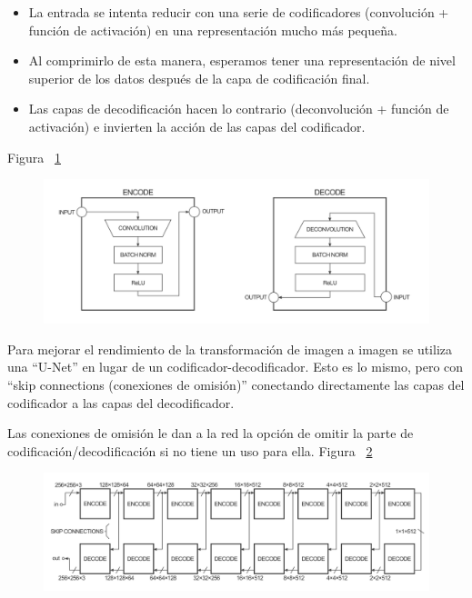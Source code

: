 \documentclass[10pt,journal,compsoc]{IEEEtran}\usepackage[T1]{fontenc}                              %
\begin{document}
\begin{itemize}
\item
  La entrada se intenta reducir con una serie de codificadores
  (convolución + función de activación) en una representación mucho más
  pequeña.
\item
  Al comprimirlo de esta manera, esperamos tener una representación de
  nivel superior de los datos después de la capa de codificación final.
\item
  Las capas de decodificación hacen lo contrario (deconvolución +
  función de activación) e invierten la acción de las capas del
  codificador.
\end{itemize}

Figura ~\ref{fig:5}

\begin{figure}[!htb]
  \begin{center}
    \includegraphics[width=\linewidth]{./imgs/06_pix2pix_example.png}
    \caption{}
    \label{fig:5}
  \end{center}
\end{figure}

Para mejorar el rendimiento de la transformación de imagen a imagen se
utiliza una ``U-Net'' en lugar de un codificador-decodificador. Esto es
lo mismo, pero con ``skip connections (conexiones de omisión)''
conectando directamente las capas del codificador a las capas del
decodificador.

Las conexiones de omisión le dan a la red la opción de omitir la parte
de codificación/decodificación si no tiene un uso para ella. Figura ~\ref{fig:6}

\begin{figure}[!htb]
  \begin{center}
    \includegraphics[width=\linewidth]{./imgs/07_pix2pix_example.png}
    \caption{}
    \label{fig:6}
  \end{center}
\end{figure}
\end{document}
